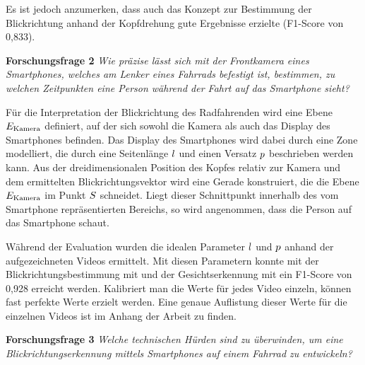 Es ist jedoch anzumerken, dass auch das Konzept zur Bestimmung der Blickrichtung anhand der Kopfdrehung gute Ergebnisse erzielte (F1-Score von 0,833).

\vspace{0.3cm}
\noindent\textbf{Forschungsfrage 2} \textit{Wie präzise lässt sich mit der Frontkamera eines Smartphones, welches am Lenker eines Fahrrads befestigt ist, bestimmen, zu welchen Zeitpunkten eine Person während der Fahrt auf das Smartphone sieht?}
\vspace{0.3cm}

Für die Interpretation der Blickrichtung des Radfahrenden wird eine Ebene $E_{\text{Kamera}}$ definiert, auf der sich sowohl die Kamera als auch das Display des Smartphones befinden. Das Display des Smartphones wird dabei durch eine Zone modelliert, die durch eine Seitenlänge $l$ und einen Versatz $p$ beschrieben werden kann. Aus der dreidimensionalen Position des Kopfes relativ zur Kamera und dem ermittelten Blickrichtungsvektor wird eine Gerade konstruiert, die die Ebene $E_{\text{Kamera}}$ im Punkt $S$ schneidet. Liegt dieser Schnittpunkt innerhalb des vom Smartphone repräsentierten Bereichs, so wird angenommen, dass die Person auf das Smartphone schaut. 

Während der Evaluation wurden die idealen Parameter $l$ und $p$ anhand der aufgezeichneten Videos ermittelt. Mit diesen Parametern konnte mit der Blickrichtungsbestimmung mit \ethg und der Gesichtserkennung mit \mediapipe ein F1-Score von 0,928 erreicht werden. Kalibriert man die Werte für jedes Video einzeln, können fast perfekte Werte erzielt werden. Eine genaue Auflistung dieser Werte für die einzelnen Videos ist im Anhang der Arbeit zu finden.

\vspace{0.3cm}
\noindent\textbf{Forschungsfrage 3} \textit{Welche technischen Hürden sind zu überwinden, um eine Blickrichtungserkennung mittels Smartphones auf einem Fahrrad zu entwickeln?}
\vspace{0.3cm}

